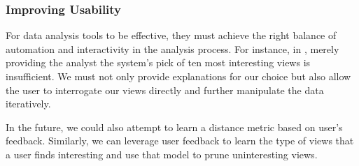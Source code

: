 \subsubsection{Improving Usability} 
For data analysis tools to be effective,
they must achieve the right balance of automation and interactivity in the analysis
process.
For instance, in \SeeDB, merely providing the analyst the system's pick of ten
most interesting views is insufficient. We must not only provide explanations
for our choice but also allow the user to interrogate our views directly and
further manipulate the data iteratively. 

In the future, we could also attempt to learn a distance metric based on user's
feedback. Similarly, we can leverage user feedback to learn the type of views
that a user finds interesting and use that model to prune uninteresting views.


